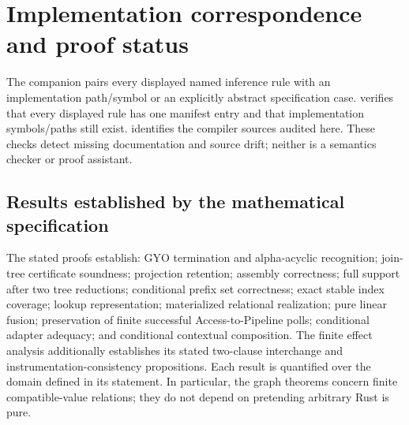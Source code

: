 \section{Implementation correspondence and proof status}
\label{sec:conformance}
The companion  pairs every displayed named inference rule with
an implementation path/symbol or an explicitly abstract specification case.
 verifies that every displayed rule has one manifest entry and
that implementation symbols/paths still exist.  identifies
the compiler sources audited here. These checks detect missing documentation
and source drift; neither is a semantics checker or proof assistant.

\subsection{Results established by the mathematical specification}
The stated proofs establish: GYO termination and alpha-acyclic recognition;
join-tree certificate soundness; projection retention; assembly correctness;
full support after two tree reductions; conditional prefix set correctness;
exact stable index coverage; lookup representation; materialized relational
realization; pure linear fusion; preservation of finite successful
Access-to-Pipeline polls; conditional adapter adequacy; and conditional contextual
composition. The finite effect analysis additionally establishes its stated
two-clause interchange and instrumentation-consistency propositions. Each
result is quantified over the domain defined in its
statement. In particular, the graph theorems concern finite compatible-value
relations; they do not depend on pretending arbitrary Rust is pure.


